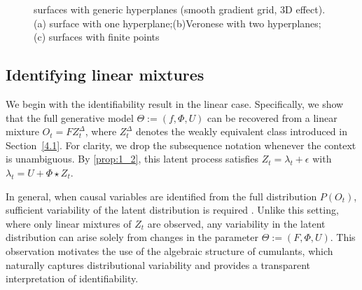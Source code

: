\documentclass[10pt]{article}
\numberwithin{figure}{section}
\begin{document}
\begin{figure}[htbp]
{\begin{subfigure}[t]{0.3\textwidth}
\caption{}
\end{subfigure}
} %
\caption{surfaces with generic hyperplanes (smooth gradient grid, 3D effect). (a)  surface with one hyperplane;(b)Veronese with two hyperplanes;(c) surfaces with finite points}
\label{fig:veronese_hyperplanes_3d}
\end{figure}





\subsection{Identifying linear mixtures}

We begin with the identifiability result in the linear case. Specifically, we show that the full generative model $\Theta := (f, \Phi, U)$ can be recovered from a linear mixture $O_t = FZ_t^{\Delta}$, where $Z_t^{\Delta}$ denotes the weakly equivalent class introduced in Section~\ref{4.1}. For clarity, we drop the subsequence notation whenever the context is unambiguous. By \autoref{prop:1_2}, this latent process satisfies $Z_t = \lambda_t + \epsilon$ with $\lambda_t = U + \Phi \star Z_t$.

In general, when causal variables are identified from the full distribution $P(O_t)$, sufficient variability of the latent distribution is required \citep{yao_learning_2022,song_temporally_2023,zhang_causal_2024}. Unlike this setting, where only linear mixtures of $Z_t$ are observed, any variability in the latent distribution can arise solely from changes in the parameter 
$\Theta := (F,\Phi,U)$. This observation motivates the use of the algebraic structure of cumulants, which naturally captures distributional variability and provides a transparent interpretation of identifiability. 
\end{document}
